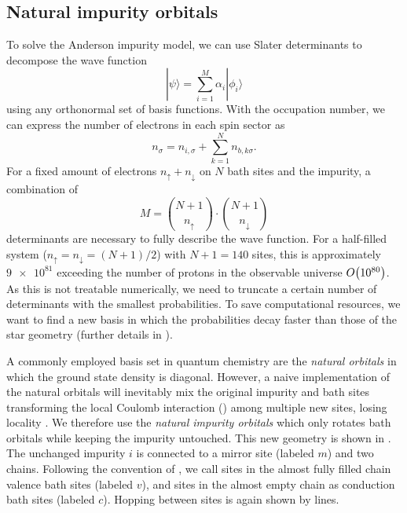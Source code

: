 \subsection{Natural impurity orbitals}
\label{sec:natural-impurity-orbitals}

To solve the Anderson impurity model,
we can use Slater determinants to decompose the wave function
\begin{equation}
    | \psi \rangle = \sum_{i=1}^M \alpha_i | \phi_i \rangle
\end{equation}
using any orthonormal set of basis functions.
With the occupation number,
we can express the number of electrons in each spin sector as
\begin{equation}
    n_\sigma = n_{i,\sigma} + \sum_{k=1}^N n_{b,k\sigma}.
\end{equation}
For a fixed amount of electrons $n_\uparrow + n_\downarrow$ on $N$ bath sites and the impurity,
a combination of
\begin{equation}
    M = \binom{N+1}{n_\uparrow} \cdot \binom{N+1}{n_\downarrow}
\end{equation}
determinants are necessary to fully describe the wave function.
For a half-filled system ($n_\uparrow = n_\downarrow = (N+1)/2$)
with $N+1=140$ sites, this is approximately $\num{9e81}$
exceeding the number of protons in the observable universe $O\!\left(\num{e80}\right)$. %
As this is not treatable numerically,
we need to truncate a certain number of determinants with the smallest probabilities.
To save computational resources,
we want to find a new basis in which the probabilities decay faster than those of the star geometry
(further details in \cite{Bi2019}).

A commonly employed basis set in quantum chemistry are the \emph{natural orbitals}
in which the ground state density is diagonal.
However,
a naive implementation of the natural orbitals will inevitably mix the original impurity
and bath sites transforming the local Coulomb interaction ()
among multiple new sites,
losing locality \cite{Lu2014,Lu2019}.
We therefore use the \emph{natural impurity orbitals}
which only rotates bath orbitals while keeping the impurity untouched.
This new geometry is shown in .
The unchanged impurity $i$ is connected to a mirror site (labeled $m$) and two chains.
Following the convention of \cite{Lu2014,Lu2019},
we call sites in the almost fully filled chain valence bath sites (labeled $v$),
and sites in the almost empty chain as conduction bath sites (labeled $c$).
Hopping between sites is again shown by lines.

